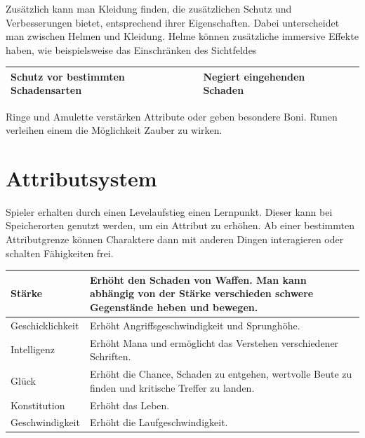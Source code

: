 \documentclass[envcountsame,envcountchap deutsch]{i-studis}
\begin{document}
	Zusätzlich kann man Kleidung finden, die zusätzlichen Schutz und Verbesserungen bietet, entsprechend
	ihrer Eigenschaften. Dabei unterscheidet man zwischen Helmen und Kleidung.
	Helme können zusätzliche immersive Effekte haben, wie beispielsweise das Einschränken des Sichtfeldes
	
		\begin{table}[]
		\centering
		\begin{tabular}{|l|l|l|}
			\hline
			Schutz vor bestimmten Schadensarten      & Negiert eingehenden Schaden \\ \hline
		\end{tabular}
	\end{table}
	
	Ringe und Amulette verstärken Attribute oder geben besondere Boni.
	Runen verleihen einem die Möglichkeit Zauber zu wirken.
	\pagebreak
	\section{Attributsystem}
	Spieler erhalten durch einen Levelaufstieg einen Lernpunkt. Dieser kann bei Speicherorten genutzt werden,
	um ein Attribut zu erhöhen. Ab einer bestimmten Attributgrenze können Charaktere dann mit anderen
	Dingen interagieren oder schalten Fähigkeiten frei. 

\begin{table}[ht]
	\centering
	\begin{tabular}{|l|p{9cm}|}
		\hline
		Stärke & Erhöht den Schaden von Waffen. Man kann abhängig von der Stärke verschieden schwere Gegenstände heben und bewegen. \\ \hline
		
		Geschicklichkeit & Erhöht Angriffsgeschwindigkeit und Sprunghöhe. \\ \hline
		
		Intelligenz & Erhöht Mana und ermöglicht das Verstehen verschiedener Schriften. \\ \hline
		
		Glück & Erhöht die Chance, Schaden zu entgehen, wertvolle Beute zu finden und kritische Treffer zu landen. \\ \hline
		
		Konstitution & Erhöht das Leben. \\ \hline
		
		Geschwindigkeit & Erhöht die Laufgeschwindigkeit. \\ \hline
	\end{tabular}
\end{table}
\end{document}
